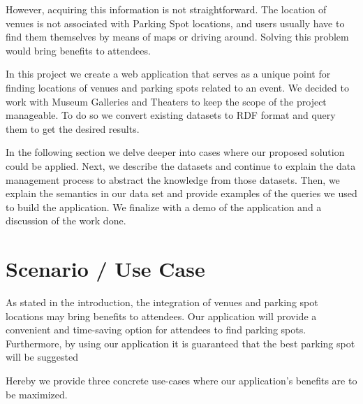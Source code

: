 \documentclass[runningheads,a4paper]{../../StyleFiles/llncs}
\begin{document}
However, acquiring this information is not straightforward. The location of venues is not associated with Parking Spot locations, and users usually have to find them themselves by means of maps or driving around. Solving this problem would bring benefits to attendees. %

In this project we create a web application that serves as a unique point for finding locations of venues and parking spots related to an event. We decided to work with Museum Galleries and Theaters to keep the scope of the project manageable. To do so we convert existing datasets to RDF format and query them to get the desired results.

In the following section we delve deeper into cases where our proposed solution could be applied. Next, we describe the datasets and continue to explain the data management process to abstract the knowledge from those datasets. Then, we explain the semantics in our data set and provide examples of the queries we used to build the application. We finalize with a demo of the application and a discussion of the work done.  

\section{Scenario / Use Case}

As stated in the introduction, the integration of venues and parking spot locations may bring benefits to attendees. Our application will provide a convenient and time-saving option for attendees to find parking spots. Furthermore, by using our application it is guaranteed that the best parking spot will be suggested %

Hereby we provide three concrete use-cases where our application's benefits are to be maximized.
\end{document}
